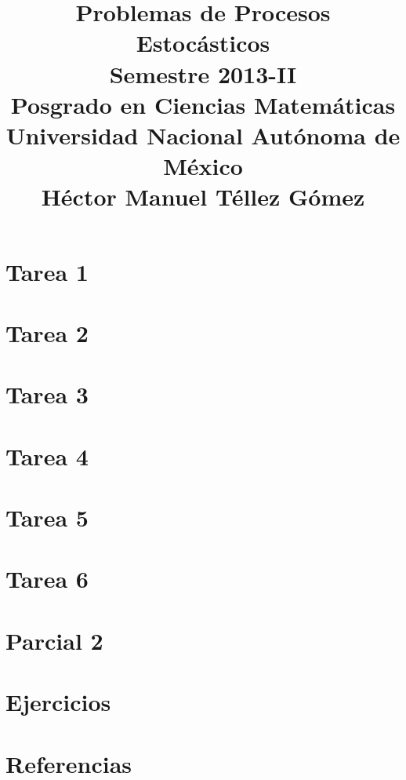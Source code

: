 \documentclass[a5paper,oneside]{amsart}
\title[Tarea de procesos estocásticos 2013-2]{
    Problemas de Procesos Estocásticos\\ 
    Semestre 2013-II\\ 
    Posgrado en Ciencias Matemáticas\\ 
    Universidad Nacional Autónoma de México\\
    Héctor Manuel Téllez Gómez
}
\theoremstyle{definition}
\numberwithin{section}{part}
\numberwithin{equation}{subsection}
\begin{document}
    \maketitle
    \part{Tarea 1}
                
        \nqed
        
    \part{Tarea 2}
                
        \nqed
        
    \part{Tarea 3}
                
        \nqed
            
    \part{Tarea 4}
                
        \nqed    
    
    \part{Tarea 5}
                
        \nqed
    
    \part{Tarea 6}
                
        \nqed

    \part{Parcial 2}
        
        \pn
        \nqed

    \part{Ejercicios}
                
        \nqed
    
    \part*{Referencias}
        
        
        \newpage
\end{document}
